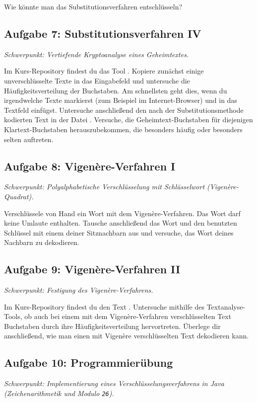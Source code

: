 Wie könnte man das Substitutionsverfahren entschlüsseln?


\subsection{Aufgabe 7: Substitutionsverfahren IV \tagZusatz \tagGKWahl}
\noindent \emph{Schwerpunkt: Vertiefende Kryptoanalyse eines Geheimtextes.}

Im Kurs-Repository findest du das Tool . Kopiere
zunächst einige unverschlüsselte Texte in das Eingabefeld und untersuche die
Häufigkeitsverteilung der Buchstaben. Am schnellsten geht dies, wenn du
irgendwelche Texte markierst (zum Beispiel im Internet-Browser) und in das
Textfeld einfügst. Untersuche anschließend den nach der Substitutionsmethode
kodierten Text in der Datei . Versuche, die
Geheimtext-Buchstaben für diejenigen Klartext-Buchstaben herauszubekommen, die
besonders häufig oder besonders selten auftreten.


\subsection{Aufgabe 8: Vigenère-Verfahren I \tagGKWahl}
\noindent \emph{Schwerpunkt: Polyalphabetische Verschlüsselung mit Schlüsselwort (Vigenère-Quadrat).}

Verschlüssele von Hand ein Wort mit dem Vigenère-Verfahren. Das Wort darf keine
Umlaute enthalten. Tausche anschließend das Wort und den benutzten Schlüssel mit
einem deiner Sitznachbarn aus und versuche, das Wort deines Nachbarn zu
dekodieren.


\subsection{Aufgabe 9: Vigenère-Verfahren II \tagZusatz \tagGKWahl}
\noindent \emph{Schwerpunkt: Festigung des Vigenère-Verfahrens.}

Im Kurs-Repository findest du den Text . Untersuche
mithilfe des Textanalyse-Tools, ob auch bei einem mit dem Vigenère-Verfahren
verschlüsselten Text Buchstaben durch ihre Häufigkeitsverteilung hervortreten.
Überlege dir anschließend, wie man einen mit Vigenère verschlüsselten Text
dekodieren kann.


\subsection{Aufgabe 10: Programmierübung \tagZusatz \tagGKWahl}
\noindent \emph{Schwerpunkt: Implementierung eines Verschlüsselungsverfahrens in Java (Zeichenarithmetik und Modulo \texttt{26}).}

